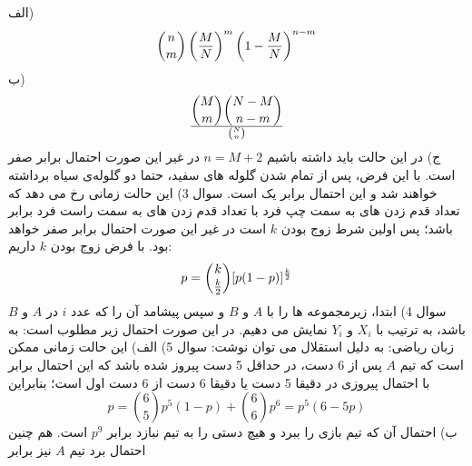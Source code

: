 \documentclass[10pt,letterpaper]{article}
\begin{document}
الف)
$$
\binom{n}{m}\left({M\over N}\right)^m\left(1-{M\over N}\right)^{n-m}
$$
ب)
$$
\binom{M}{m}\binom{N-M}{n-m}\over \binom{N}{n}
$$
ج) در این حالت باید داشته باشیم $n=M+2$ در غیر این صورت احتمال برابر صفر است. با این فرض، پس از تمام شدن گلوله های سفید، حتما دو گلوله‌ی سیاه برداشته خواهند شد و این احتمال برابر یک است.
\np
سوال 3) این حالت زمانی رخ می دهد که تعداد قدم زدن های به سمت چپ فرد با تعداد قدم زدن های به سمت راست فرد برابر باشد؛ پس اولین شرط زوج بودن $k$ است در غیر این صورت احتمال برابر صفر خواهد بود. با فرض زوج بودن $k$ داریم:
$$
p=\binom{k}{{k\over2}}[p(1-p)]^{k\over 2}
$$
\np
سوال 4) ابتدا، زیرمجموعه ها را با $A$ و $B$ و سپس پیشامد آن را که عدد $i$ در $A$ و $B$ باشد، به ترتیب با $X_i$ و $Y_i$ نمایش می دهیم. در این صورت احتمال زیر مطلوب است:
به زبان ریاضی:
به دلیل استقلال می توان نوشت:
\np
سوال 5) الف) این حالت زمانی ممکن است که تیم $A$ پس از 6 دست، در حداقل 5 دست پیروز شده باشد که این احتمال برابر با احتمال پیروزی در دقیقا 5 دست یا دقیقا 6 دست از 6 دست اول است؛ بنابراین
$$
p=\binom{6}{5}p^5(1-p)+\binom{6}{6}p^6=p^5(6-5p)
$$
ب) 
احتمال آن که تیم  بازی را ببرد و هیچ دستی را به تیم  نبازد برابر $p^9$ است. هم چنین احتمال برد تیم $A$ نیز برابر 
\end{document}
